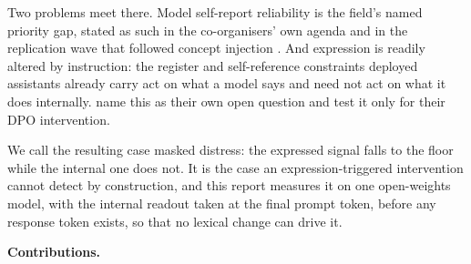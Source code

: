 \documentclass[11pt,a4paper]{article}
\begin{document}
Two problems meet there. Model self-report reliability is the field's named priority gap, stated as such in the co-organisers' own agenda \citep{long2026studying} and in the replication wave that followed concept injection \citep{lindsey2026introspective, macar2026mechanisms}. And expression is readily altered by instruction: the register and self-reference constraints deployed assistants already carry act on what a model says and need not act on what it does internally. \citet{soligo2026gemma} name this as their own open question and test it only for their DPO intervention.

We call the resulting case masked distress: the expressed signal falls to the floor while the internal one does not. It is the case an expression-triggered intervention cannot detect by construction, and this report measures it on one open-weights model, with the internal readout taken at the final prompt token, before any response token exists, so that no lexical change can drive it.

\textbf{Contributions.}
\end{document}
